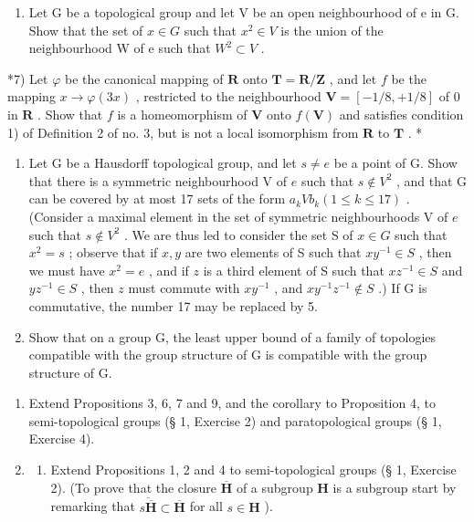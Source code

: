 \begin{enumerate}
\def\labelenumi{\arabic{enumi})}
\setcounter{enumi}{5}
\tightlist
\item
  Let G be a topological group and let V be an open neighbourhood of e in G. Show that the set of \(x \in G\) such that \(x^{2} \in V\) is the union of the neighbourhood W of e such that \(W^{2} \subset V\) .
\end{enumerate}

*7) Let \(\varphi\) be the canonical mapping of \(\mathbf{R}\) onto \(\mathbf{T} = \mathbf{R} / \mathbf{Z}\) , and let \(f\) be the mapping \(x \to \varphi(3x)\) , restricted to the neighbourhood \(\mathbf{V} = [-1/8, +1/8]\) of \(0\) in \(\mathbf{R}\) . Show that \(f\) is a homeomorphism of \(\mathbf{V}\) onto \(f(\mathbf{V})\) and satisfies condition 1) of Definition 2 of no. 3, but is not a local isomorphism from \(\mathbf{R}\) to \(\mathbf{T}\) . *

\begin{enumerate}
\def\labelenumi{\arabic{enumi})}
\setcounter{enumi}{7}
\item
  Let G be a Hausdorff topological group, and let \(s \neq e\) be a point of G. Show that there is a symmetric neighbourhood V of \(e\) such that \(s \notin V^2\) , and that G can be covered by at most 17 sets of the form \(a_k V b_k (1 \leqslant k \leqslant 17)\) . (Consider a maximal element in the set of symmetric neighbourhoods V of \(e\) such that \(s \notin V^2\) . We are thus led to consider the set S of \(x \in G\) such that \(x^2 = s\) ; observe that if \(x, y\) are two elements of S such that \(xy^{-1} \in S\) , then we must have \(x^2 = e\) , and if \(z\) is a third element of S such that \(xz^{-1} \in S\) and \(yz^{-1} \in S\) , then \(z\) must commute with \(xy^{-1}\) , and \(xy^{-1}z^{-1} \notin S\) .) If G is commutative, the number 17 may be replaced by 5.
\item
  Show that on a group G, the least upper bound of a family of topologies compatible with the group structure of G is compatible with the group structure of G.
\end{enumerate}

\BourbakiExerciseGroup

\begin{enumerate}
\def\labelenumi{\arabic{enumi})}
\item
  Extend Propositions 3, 6, 7 and 9, and the corollary to Proposition 4, to semi-topological groups (§ 1, Exercise 2) and paratopological groups (§ 1, Exercise 4).
\item
  \begin{enumerate}
  \def\labelenumii{\alph{enumii})}
  \tightlist
  \item
    Extend Propositions 1, 2 and 4 to semi-topological groups (§ 1, Exercise 2). (To prove that the closure \(\overline{\mathbf{H}}\) of a subgroup \(\mathbf{H}\) is a subgroup start by remarking that \(\overline{s\overline{\mathbf{H}}} \subset \overline{\mathbf{H}}\) for all \(s \in \mathbf{H}\) ).
  \end{enumerate}
\end{enumerate}

